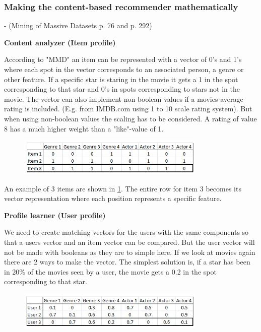 \subsubsection{Making the content-based recommender mathematically}
- (Mining of Massive Datasets p. 76 and p. 292)

\textbf{Content analyzer (Item profile)}

According to "MMD" an item can be represented with a vector of 0's and 1's where each spot in the vector corresponds to an associated person, a genre or other feature. If a specific star is staring in the movie it gets a 1 in the spot corresponding to that star and 0's in spots corresponding to stars not in the movie. The vector can also implement non-boolean values if a movies average rating is included. (E.g. from IMDB.com using 1 to 10 scale rating system). But when using non-boolean values the scaling has to be considered. A rating of value 8 has a much higher weight than a "like"-value of 1.

\begin{figure}[H]
\centering
\includegraphics[width=0.8\textwidth]{Images/Vectorrepresentationitems.png}
\caption{}
\label{VrepItem}
\end{figure}

An example of 3 items are shown in \ref{VrepItem}. The entire row for item 3 becomes its vector representation where each position represents a specific feature.  
 
\textbf{Profile learner (User profile)}

We need to create matching vectors for the users with the same components so that a users vector and an item vector can be compared. But the user vector will not be made with booleans as they are to simple here. If we look at movies again there are 2 ways to make the vector. The simplest solution is, if a star has been in 20\% of the movies seen by a user, the movie gets a 0.2 in the spot corresponding to that star.

\begin{figure}[H]
\centering
\includegraphics[width=0.8\textwidth]{Images/VectorrepresentationUsers.png}
\caption{}
\label{VrepUser}
\end{figure}

